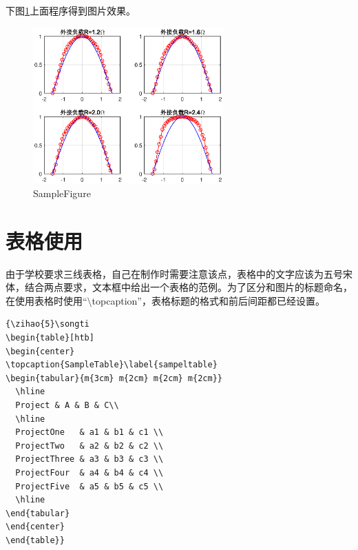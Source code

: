 {\begin{spacing}{1.5}
\begin{lstlisting}
\end{lstlisting}

下图\ref{samplefigure}上面程序得到图片效果。

\begin{figure}[htbp]
  \centering
  \includegraphics[width=0.65\textwidth]{figure//fig_calculate}
  \caption{SampleFigure}\label{samplefigure}
\end{figure}

\section{表格使用}
由于学校要求三线表格，自己在制作时需要注意该点，表格中的文字应该为五号宋体，结合两点要求，文本框中给出一个表格的范例。为了区分和图片的标题命名，在使用表格时使用“$\setminus$topcaption”，表格标题的格式和前后间距都已经设置。

\begin{lstlisting}
{\zihao{5}\songti
\begin{table}[htb]
\begin{center}
\topcaption{SampleTable}\label{sampeltable}
\begin{tabular}{m{3cm} m{2cm} m{2cm} m{2cm}}
  \hline
  Project & A & B & C\\
  \hline
  ProjectOne   & a1 & b1 & c1 \\
  ProjectTwo   & a2 & b2 & c2 \\
  ProjectThree & a3 & b3 & c3 \\
  ProjectFour  & a4 & b4 & c4 \\
  ProjectFive  & a5 & b5 & c5 \\
  \hline
\end{tabular}
\end{center}
\end{table}}
\end{lstlisting}


\end{spacing}}
